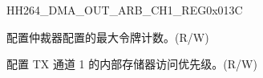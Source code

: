 \begin{register}{H}{H264\_DMA\_OUT\_ARB\_CH1\_REG}{0x013C}\label{regdesc:H264DMAOUTARBCH1REG}
%
%
%
%
\regnewline%
\begin{regdesc}\begin{reglist}
\label{fielddesc:H264DMAOUTARBTOKENNUMCH1}\item [H264\_DMA\_OUT\_ARB\_TOKEN\_NUM\_CH1] 配置仲裁器配置的最大令牌计数。(R/W)
\label{fielddesc:H264DMAINTEROUTARBPRIORITYCH1}\item [H264\_DMA\_INTER\_OUT\_ARB\_PRIORITY\_CH1] 配置 TX 通道 1 的内部存储器访问优先级。(R/W)
\end{reglist}\end{regdesc}
\end{register}




